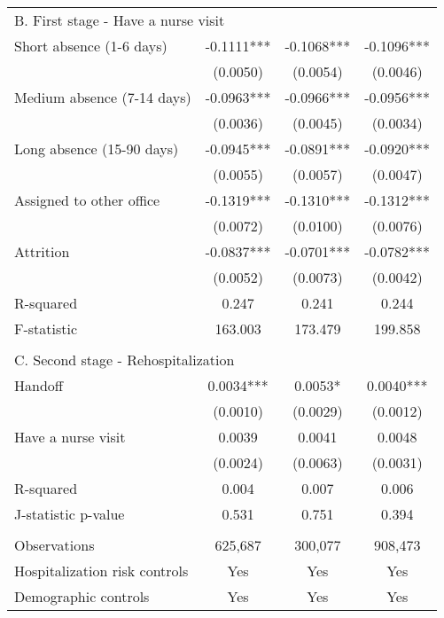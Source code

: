 \documentclass[final,12pt, notitlepage]{article}
\begin{document}
\begin{singlespace}
\begin{table}[H]
\begin{threeparttable}
{\begin{tabular*}{\textwidth}{l@{\extracolsep{\fill}}*{3}{c}}
\multicolumn{4}{l}{B. First stage - Have a nurse visit} \\
Short absence (1-6 days) &     -0.1111*** &     -0.1068*** &     -0.1096***\\
                  &    (0.0050)      &    (0.0054)      &    (0.0046)   \\
Medium absence (7-14 days)&     -0.0963*** &     -0.0966*** &     -0.0956***\\
                  &    (0.0036)     &    (0.0045)     &    (0.0034)   \\
Long absence (15-90 days)&     -0.0945*** &     -0.0891*** &     -0.0920***\\
                 &    (0.0055)      &    (0.0057)      &    (0.0047)   \\
Assigned to other office&     -0.1319*** &     -0.1310*** &     -0.1312***\\
                &    (0.0072)      &    (0.0100)      &    (0.0076)   \\
Attrition        &     -0.0837***  &     -0.0701*** &     -0.0782***\\
                    &    (0.0052)    &    (0.0073)     &    (0.0042)   \\
R-squared           &       0.247   &       0.241    &       0.244   \\
F-statistic       &     163.003        &     173.479     &     199.858   \\
\\
\multicolumn{4}{l}{C. Second stage - Rehospitalization} \\
Handoff         &      0.0034***     &      0.0053*   &      0.0040***\\
                   &    (0.0010)     &    (0.0029)    &    (0.0012)   \\
Have a nurse visit   &      0.0039   &      0.0041    &      0.0048   \\
                    &    (0.0024)     &    (0.0063)    &    (0.0031)   \\
R-squared          &       0.004      &       0.007    &       0.006   \\
J-statistic p-value    &       0.531   &       0.751   &       0.394   \\
\\
\midrule
Observations       &      625,687   &      300,077      &      908,473   \\
Hospitalization risk controls & Yes & Yes & Yes \\
Demographic controls & Yes & Yes & Yes \\

\end{tabular*}}
\end{threeparttable}
\end{table}
\end{singlespace}
\end{document}
